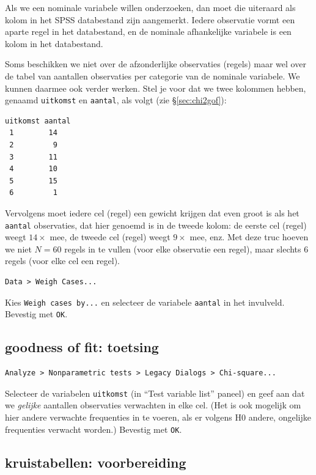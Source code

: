 \documentclass[
]{book}
\begin{document}
Als we een nominale variabele willen onderzoeken, dan moet die uiteraard
als kolom in het SPSS databestand zijn aangemerkt. Iedere observatie
vormt een aparte regel in het databestand, en de nominale afhankelijke
variabele is een kolom in het databestand.

Soms beschikken we niet over de afzonderlijke observaties (regels) maar
wel over de tabel van aantallen observaties per categorie van de
nominale variabele. We kunnen daarmee ook verder werken. Stel je voor
dat we twee kolommen hebben, genaamd \texttt{uitkomst} en \texttt{aantal}, als volgt
(zie §\ref{sec:chi2gof}):

\begin{verbatim}
uitkomst aantal
 1        14
 2         9
 3        11
 4        10
 5        15
 6         1
\end{verbatim}

Vervolgens moet iedere cel (regel) een gewicht krijgen dat even groot is
als het \texttt{aantal} observaties, dat hier genoemd is in de tweede kolom: de
eerste cel (regel) weegt \(14\times\) mee, de tweede cel (regel) weegt
\(9\times\) mee, enz. Met deze truc hoeven we niet \(N=60\) regels in te
vullen (voor elke observatie een regel), maar slechts 6 regels (voor
elke cel een regel).

\begin{verbatim}
Data > Weigh Cases... 
\end{verbatim}

Kies \texttt{Weigh\ cases\ by...} en selecteer de variabele \texttt{aantal} in
het invulveld. Bevestig met \texttt{OK}.

\subsection{goodness of fit: toetsing}\label{goodness-of-fit-toetsing}

\begin{verbatim}
Analyze > Nonparametric tests > Legacy Dialogs > Chi-square...
\end{verbatim}

Selecteer de variabelen \texttt{uitkomst} (in ``Test variable list'' paneel) en
geef aan dat we \emph{gelijke} aantallen observaties verwachten in elke cel.
(Het is ook mogelijk om hier andere verwachte frequenties in te voeren,
als er volgens H0 andere, ongelijke frequenties verwacht worden.)
Bevestig met \texttt{OK}.

\subsection{kruistabellen: voorbereiding}\label{kruistabellen-voorbereiding}
\end{document}
